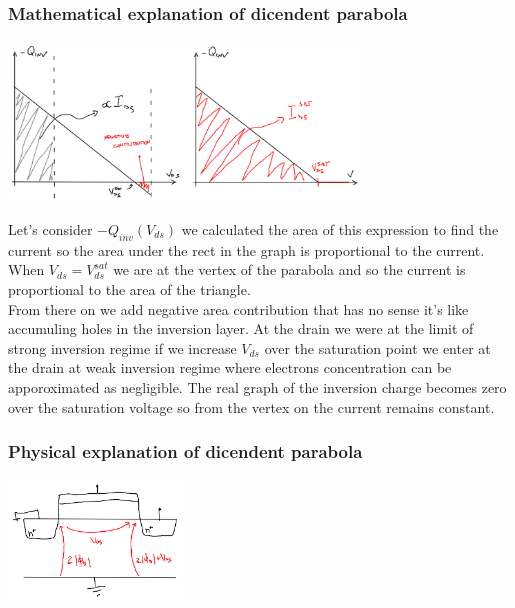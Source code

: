 \subsubsection{Mathematical explanation of dicendent parabola}

\centering
\includegraphics[width=0.7\textwidth]{mathexpl.png}\\
\raggedright

Let's consider $-Q_{inv}(V_{ds})$ we calculated the area of this expression to find the current so the area under the rect in the graph is proportional to the current. When $V_{ds}=V_{ds}^{sat}$ we are at the vertex of the parabola and so the current is proportional to the area of the triangle.\\
From there on we add negative area contribution that has no sense it's like accumuling holes in the inversion layer. At the drain we were at the limit of strong inversion regime if we increase $V_{ds}$ over the saturation point we enter at the drain at weak inversion regime where electrons concentration can be apporoximated as negligible. The real graph of the inversion charge becomes zero over the saturation voltage so from the vertex on the current remains constant.\\

\subsubsection{Physical explanation of dicendent parabola}


\centering
\includegraphics[width=0.35\textwidth]{f1.png}\\
\raggedright

